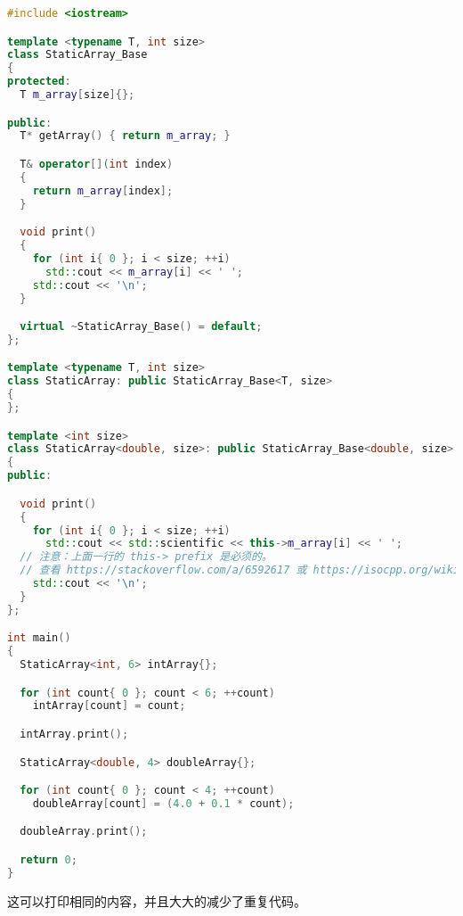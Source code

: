 \documentclass[../../LearnCpp.tex]{subfiles}
\begin{document}
\begin{lstlisting}[language=C++]
#include <iostream>

template <typename T, int size>
class StaticArray_Base
{
protected:
  T m_array[size]{};

public:
  T* getArray() { return m_array; }

  T& operator[](int index)
  {
    return m_array[index];
  }

  void print()
  {
    for (int i{ 0 }; i < size; ++i)
      std::cout << m_array[i] << ' ';
    std::cout << '\n';
  }

  virtual ~StaticArray_Base() = default;
};

template <typename T, int size>
class StaticArray: public StaticArray_Base<T, size>
{
};

template <int size>
class StaticArray<double, size>: public StaticArray_Base<double, size>
{
public:

  void print()
  {
    for (int i{ 0 }; i < size; ++i)
      std::cout << std::scientific << this->m_array[i] << ' ';
  // 注意：上面一行的 this-> prefix 是必须的。
  // 查看 https://stackoverflow.com/a/6592617 或 https://isocpp.org/wiki/faq/templates#nondependent-name-lookup-members 可以了解更多的细节。
    std::cout << '\n';
  }
};

int main()
{
  StaticArray<int, 6> intArray{};

  for (int count{ 0 }; count < 6; ++count)
    intArray[count] = count;

  intArray.print();

  StaticArray<double, 4> doubleArray{};

  for (int count{ 0 }; count < 4; ++count)
    doubleArray[count] = (4.0 + 0.1 * count);

  doubleArray.print();

  return 0;
}
\end{lstlisting}

这可以打印相同的内容，并且大大的减少了重复代码。
\end{document}
